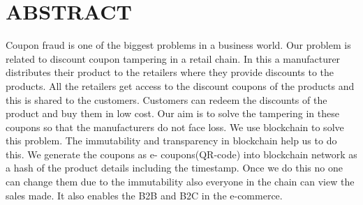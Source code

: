 
\chapter*{\rm \large \bf ABSTRACT}
\vspace{4.0mm}
\setlength{\parindent}{4em}

\par
Coupon fraud is one of the biggest problems in a business world. Our problem is related
to discount coupon tampering in a retail chain. In this a manufacturer distributes their product to
the retailers where they provide discounts to the products. All the retailers get access to the
discount coupons of the products and this is shared to the customers. Customers can redeem the
discounts of the product and buy them in low cost. Our aim is to solve the tampering in these
coupons so that the manufacturers do not face loss. We use blockchain to solve this problem. The
immutability and transparency in blockchain help us to do this. We generate the coupons as e-
coupons(QR-code) into blockchain network as a hash of the product details including the
timestamp. Once we do this no one can change them due to the immutability also everyone in the
chain can view the sales made. It also enables the B2B and B2C in the e-commerce.

\newpage 
